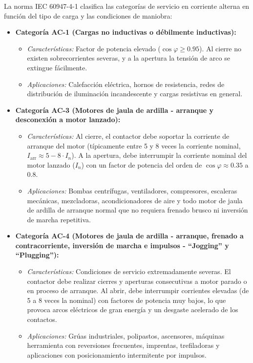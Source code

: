 \begin{enumerate}
    La norma IEC 60947-4-1 clasifica las categorías de servicio en corriente alterna en función del tipo de carga y las condiciones de maniobra:
    \begin{itemize}
        \item \textbf{Categoría AC-1 (Cargas no inductivas o débilmente inductivas):}
        \begin{itemize}
            \item \textit{Características:} Factor de potencia elevado ($\cos\varphi \geq 0.95$). Al cierre no existen sobrecorrientes severas, y a la apertura la tensión de arco se extingue fácilmente.
            \item \textit{Aplicaciones:} Calefacción eléctrica, hornos de resistencia, redes de distribución de iluminación incandescente y cargas resistivas en general.
        \end{itemize}
        \item \textbf{Categoría AC-3 (Motores de jaula de ardilla - arranque y desconexión a motor lanzado):}
        \begin{itemize}
            \item \textit{Características:} Al cierre, el contactor debe soportar la corriente de arranque del motor (típicamente entre 5 y 8 veces la corriente nominal, $I_{\text{arr}} \approx 5-8 \cdot I_n$). A la apertura, debe interrumpir la corriente nominal del motor lanzado ($I_n$) con un factor de potencia del orden de $\cos\varphi \approx 0.35$ a $0.8$.
            \item \textit{Aplicaciones:} Bombas centrífugas, ventiladores, compresores, escaleras mecánicas, mezcladoras, acondicionadores de aire y todo motor de jaula de ardilla de arranque normal que no requiera frenado brusco ni inversión de marcha repetitiva.
        \end{itemize}
        \item \textbf{Categoría AC-4 (Motores de jaula de ardilla - arranque, frenado a contracorriente, inversión de marcha e impulsos - ``Jogging'' y ``Plugging''):}
        \begin{itemize}
            \item \textit{Características:} Condiciones de servicio extremadamente severas. El contactor debe realizar cierres y aperturas consecutivas a motor parado o en proceso de arranque. Al abrir, debe interrumpir corrientes elevadas (de 5 a 8 veces la nominal) con factores de potencia muy bajos, lo que provoca arcos eléctricos de gran energía y un desgaste acelerado de los contactos.
            \item \textit{Aplicaciones:} Grúas industriales, polipastos, ascensores, máquinas herramienta con reversiones frecuentes, imprentas, trefiladoras y aplicaciones con posicionamiento intermitente por impulsos.
        \end{itemize}
    \end{itemize}
\end{enumerate}
